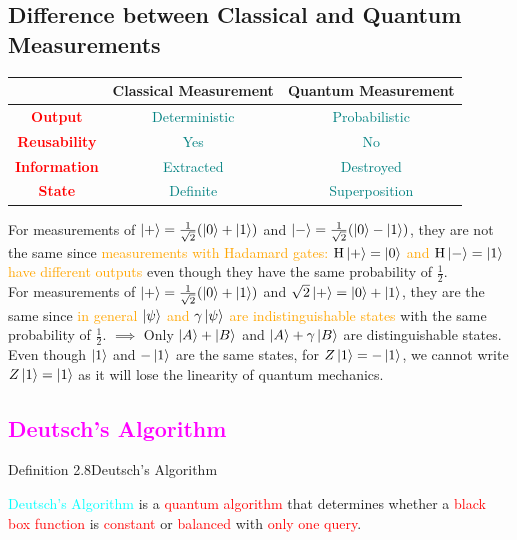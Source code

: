 \documentclass{book}
\begin{document}
\subsection{Difference between Classical and Quantum Measurements}
\begin{center}
    \begin{tabular}{|c|c|c|}
        \hline
        \rowcolor{lightblue}
        & \textbf{Classical Measurement} & \textbf{Quantum Measurement} \\      \hline
        \textcolor{red}{\textbf{Output}} & \textcolor{teal}{Deterministic} & \textcolor{teal}{Probabilistic} \\
        \hline
        \textcolor{red}{\textbf{Reusability}} & \textcolor{teal}{Yes} & \textcolor{teal}{No} \\
        \hline
        \textcolor{red}{\textbf{Information}} & \textcolor{teal}{Extracted} & \textcolor{teal}{Destroyed} \\
        \hline
        \textcolor{red}{\textbf{State}} & \textcolor{teal}{Definite} & \textcolor{teal}{Superposition} \\
        \hline
    \end{tabular}
\end{center}
For measurements of \(\ket{+} = \frac{1}{\sqrt{2}}(\ket{0} + \ket{1})\) and \(\ket{-} = \frac{1}{\sqrt{2}}(\ket{0} - \ket{1})\), they are not the same since \textcolor{orange}{measurements with Hadamard gates: \(\text{H}\ket{+} = \ket{0}\) and \(\text{H}\ket{-} = \ket{1}\) have different outputs} even though they have the same probability of \(\frac{1}{2}\).\\
For measurements of \(\ket{+} = \frac{1}{\sqrt{2}}(\ket{0} + \ket{1})\) and \(\sqrt{2}\ket{+} = \ket{0} + \ket{1}\), they are the same since \textcolor{orange}{in general $\ket{\psi}$ and $\gamma\ket{\psi}$ are indistinguishable states} with the same probability of \(\frac{1}{2}\). $\implies$ Only $\ket{A} + \ket{B}$ and $\ket{A} + \gamma\ket{B}$ are distinguishable states.\\
Even though $\ket{1}$ and $-\ket{1}$ are the same states, for $Z\ket{1} = -\ket{1}$, we cannot write $Z\ket{1} = \ket{1}$ as it will lose the linearity of quantum mechanics.\\
\textcolor{magenta}{\section{\textbf{Deutsch's Algorithm}}}
\begin{defBox}{Definition 2.8}{Deutsch's Algorithm}
    \raggedright
    \textcolor{cyan}{Deutsch's Algorithm} is a \textcolor{red}{quantum algorithm} that determines whether a \textcolor{red}{black box function} is \textcolor{red}{constant} or \textcolor{red}{balanced} with \textcolor{red}{only one query}.
\end{defBox}
\end{document}
